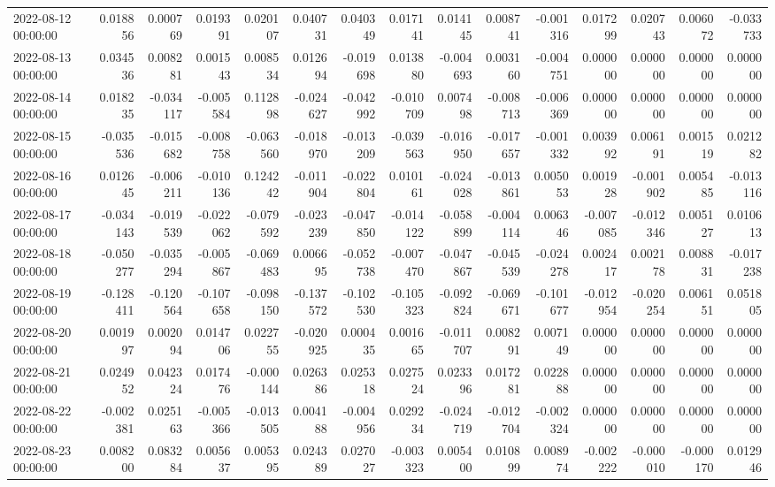 \begin{tabular}{lrrrrrrrrrrrrrr}
2022-08-12 00:00:00 & 0.018856 & 0.000769 & 0.019391 & 0.020107 & 0.040731 & 0.040349 & 0.017141 & 0.014145 & 0.008741 & -0.001316 & 0.017299 & 0.020743 & 0.006072 & -0.033733 \\
2022-08-13 00:00:00 & 0.034536 & 0.008281 & 0.001543 & 0.008534 & 0.012694 & -0.019698 & 0.013880 & -0.004693 & 0.003160 & -0.004751 & 0.000000 & 0.000000 & 0.000000 & 0.000000 \\
2022-08-14 00:00:00 & 0.018235 & -0.034117 & -0.005584 & 0.112898 & -0.024627 & -0.042992 & -0.010709 & 0.007498 & -0.008713 & -0.006369 & 0.000000 & 0.000000 & 0.000000 & 0.000000 \\
2022-08-15 00:00:00 & -0.035536 & -0.015682 & -0.008758 & -0.063560 & -0.018970 & -0.013209 & -0.039563 & -0.016950 & -0.017657 & -0.001332 & 0.003992 & 0.006191 & 0.001519 & 0.021282 \\
2022-08-16 00:00:00 & 0.012645 & -0.006211 & -0.010136 & 0.124242 & -0.011904 & -0.022804 & 0.010161 & -0.024028 & -0.013861 & 0.005053 & 0.001928 & -0.001902 & 0.005485 & -0.013116 \\
2022-08-17 00:00:00 & -0.034143 & -0.019539 & -0.022062 & -0.079592 & -0.023239 & -0.047850 & -0.014122 & -0.058899 & -0.004114 & 0.006346 & -0.007085 & -0.012346 & 0.005127 & 0.010613 \\
2022-08-18 00:00:00 & -0.050277 & -0.035294 & -0.005867 & -0.069483 & 0.006695 & -0.052738 & -0.007470 & -0.047867 & -0.045539 & -0.024278 & 0.002417 & 0.002178 & 0.008831 & -0.017238 \\
2022-08-19 00:00:00 & -0.128411 & -0.120564 & -0.107658 & -0.098150 & -0.137572 & -0.102530 & -0.105323 & -0.092824 & -0.069671 & -0.101677 & -0.012954 & -0.020254 & 0.006151 & 0.051805 \\
2022-08-20 00:00:00 & 0.001997 & 0.002094 & 0.014706 & 0.022755 & -0.020925 & 0.000435 & 0.001665 & -0.011707 & 0.008291 & 0.007149 & 0.000000 & 0.000000 & 0.000000 & 0.000000 \\
2022-08-21 00:00:00 & 0.024952 & 0.042324 & 0.017476 & -0.000144 & 0.026386 & 0.025318 & 0.027524 & 0.023396 & 0.017281 & 0.022888 & 0.000000 & 0.000000 & 0.000000 & 0.000000 \\
2022-08-22 00:00:00 & -0.002381 & 0.025163 & -0.005366 & -0.013505 & 0.004188 & -0.004956 & 0.029234 & -0.024719 & -0.012704 & -0.002324 & 0.000000 & 0.000000 & 0.000000 & 0.000000 \\
2022-08-23 00:00:00 & 0.008200 & 0.083284 & 0.005637 & 0.005395 & 0.024389 & 0.027027 & -0.003323 & 0.005400 & 0.010899 & 0.008974 & -0.002222 & -0.000010 & -0.000170 & 0.012946 \\

\end{tabular}
